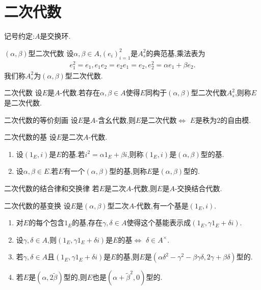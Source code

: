 \section{二次代数}

记号约定:$A$是交换环.

\begin{definition}{$\left(\alpha,\beta\right)$型二次代数}{}
	设$\alpha,\beta\in A$,$\left(e_{i}\right)_{i=1}^{2}$是$A_{s}^{2}$的典范基,乘法表为
	\begin{align*}
		e_{1}^{2}=e_{1},e_{1}e_{2}=e_{2}e_{1}=e_{2},e_{2}^{2}=\alpha e_{1}+\beta e_{2}.
	\end{align*}
	我们称$A_{s}^{2}$为$\left(\alpha,\beta\right)$型二次代数.
\end{definition}

\begin{definition}{二次代数}{}
	设$E$是$A$-代数.若存在$\alpha,\beta\in A$使得$E$同构于$\left(\alpha,\beta\right)$型二次代数$A_{s}^{2}$,则称$E$是二次代数.
\end{definition}

\begin{proposition}{二次代数的等价刻画}{}
	设$E$是$A$-含幺代数,则$E$是二次代数$\iff$ $E$是秩为$2$的自由模.
\end{proposition}

\begin{definition}{二次代数的基}{}
	设$E$是二次$A$-代数.
	\begin{enumerate}
		\item 设$\left(1_{E},i\right)$是$E$的基.若$i^{2}=\alpha 1_{E}+\beta i$,则称$\left(1_{E},i\right)$是$\left(\alpha,\beta\right)$型的基.
		\item 设$\alpha,\beta\in E$.若$E$有一个$\left(\alpha,\beta\right)$型的基,则称$E$是$\left(\alpha,\beta\right)$型的.
	\end{enumerate}
\end{definition}

\begin{proposition}{二次代数的结合律和交换律}{}
	若$E$是二次$A$-代数,则$E$是$A$-交换结合代数.
\end{proposition}

\begin{proposition}{二次代数的基变换}{}
	设$E$是$\left(\alpha,\beta\right)$型二次$A$-代数,有一个基是$\left(1_{E},i\right)$.
	\begin{enumerate}
		\item 对$E$的每个包含$1_{E}$的基,存在$\gamma,\delta\in A$使得这个基能表示成$\left(1_{E},\gamma 1_{E}+\delta i\right)$.
		\item 设$\gamma,\delta\in A$,则$\left(1_{E},\gamma 1_{E}+\delta i\right)$是$E$的基$\iff$ $\delta\in A^{\times}$.
		\item 若$\gamma,\delta\in A$且$\left(1_{E},\gamma 1_{E}+\delta i\right)$是$E$的基,则$E$是$\left(\alpha\delta^{2}-\gamma^{2}-\beta\gamma\delta,2\gamma+\beta\delta\right)$型的.
		\item 若$E$是$\left(\alpha,2\tilde{\beta}\right)$型的,则$E$也是$\left(\alpha+\tilde{\beta}^{2},0\right)$型的.
	\end{enumerate}
\end{proposition}

